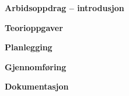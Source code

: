 

\noindent

\vskip 5pt


\textbf{Arbidsoppdrag -- introdusjon}

\textbf{Teorioppgaver}

\textbf{Planlegging}

\textbf{Gjennomføring}

\textbf{Dokumentasjon}

















\vfil \eject

















